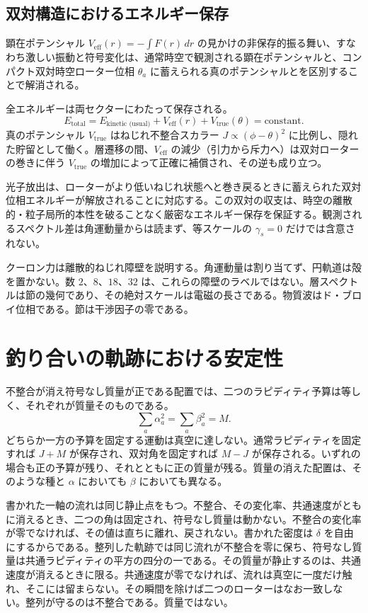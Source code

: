 \documentclass[a4paper]{article}
\begin{document}
\subsection{双対構造におけるエネルギー保存}

顕在ポテンシャル \(V_\text{eff}(r) = -\int F(r)\, dr\) の見かけの非保存的振る舞い、すなわち激しい振動と符号変化は、通常時空で観測される顕在ポテンシャルと、コンパクト双対時空ローター位相 \(\theta_a\) に蓄えられる真のポテンシャルとを区別することで解消される。

全エネルギーは両セクターにわたって保存される。
\[
E_\text{total} = E_\text{kinetic (usual)} + V_\text{eff}(r) + V_\text{true}(\theta) = \text{constant}.
\]
真のポテンシャル \(V_\text{true}\) はねじれ不整合スカラー \(J \propto (\phi - \theta)^2\) に比例し、隠れた貯留として働く。層遷移の間、\(V_\text{eff}\) の減少（引力から斥力へ）は双対ローターの巻きに伴う \(V_\text{true}\) の増加によって正確に補償され、その逆も成り立つ。

光子放出は、ローターがより低いねじれ状態へと巻き戻るときに蓄えられた双対位相エネルギーが解放されることに対応する。この双対の収支は、時空の離散的・粒子局所的本性を破ることなく厳密なエネルギー保存を保証する。観測されるスペクトル差は角運動量からは読まず、等スケールの \(\gamma_s=0\) だけでは含意されない。

クーロン力は離散的ねじれ障壁を説明する。角運動量は割り当てず、円軌道は殻を置かない。数 \(2\)、\(8\)、\(18\)、\(32\) は、これらの障壁のラベルではない。層スペクトルは節の幾何であり、その絶対スケールは電磁の長さである。物質波はド・ブロイ位相である。節は干渉因子の零である。

\section{釣り合いの軌跡における安定性}
\label{sec:particle-stability}

不整合が消え符号なし質量が正である配置では、二つのラピディティ予算は等しく、それぞれが質量そのものである。
\[
\sum_a\alpha_a^2=\sum_a\beta_a^2=M.
\]
どちらか一方の予算を固定する運動は真空に達しない。通常ラピディティを固定すれば \(J+M\) が保存され、双対角を固定すれば \(M-J\) が保存される。いずれの場合も正の予算が残り、それとともに正の質量が残る。質量の消えた配置は、そのような種と \(\alpha\) においても \(\beta\) においても異なる。

書かれた一軸の流れは同じ静止点をもつ。不整合、その変化率、共通速度がともに消えるとき、二つの角は固定され、符号なし質量は動かない。不整合の変化率が零でなければ、その値は直ちに離れ、戻されない。書かれた密度は \(\delta\) を自由にするからである。整列した軌跡では同じ流れが不整合を零に保ち、符号なし質量は共通ラピディティの平方の四分の一である。その質量が静止するのは、共通速度が消えるときに限る。共通速度が零でなければ、流れは真空に一度だけ触れ、そこには留まらない。その瞬間を除けば二つのローターはなお一致しない。整列が守るのは不整合である。質量ではない。
\end{document}
